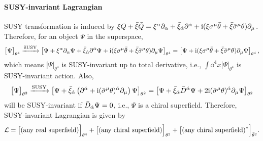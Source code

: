 \documentclass[CheatSheet]{subfiles}
\begin{document}
\paragraph{SUSY-invariant Lagrangian}
SUSY transformation is induced by $\xi Q + \bar\xi\bar Q = \xi^\alpha\partial_\alpha + \bar\xi_{\dot\alpha}\partial^{{\dot\alpha}} + \mathrm{i}(\xi\sigma^\mu\bar\theta+\bar\xi\bar\sigma^\mu\theta)\partial_\mu$.
Therefore, for an object $\Psi$ in the superspace,
\begin{equation}
 \bigl[\Psi\bigr]_{\theta^4}\xrightarrow{\text{SUSY}}
 \left[\Psi + \xi^\alpha\partial_\alpha\Psi + \bar\xi_{\dot\alpha}\partial^{{\dot\alpha}}\Psi + \mathrm{i}(\xi\sigma^\mu\bar\theta+\bar\xi\bar\sigma^\mu\theta)\partial_\mu\Psi\right]_{\theta^4}
=
 \left[\Psi +
\mathrm{i}(\xi\sigma^\mu\bar\theta+\bar\xi\bar\sigma^\mu\theta)\partial_\mu\Psi\right]_{\theta^4},
\end{equation}
which means $\bigl[\Psi\bigr]_{\theta^4}$ is SUSY-invariant up to total derivative, i.e., $\int\dd^4x \bigl[\Psi\bigr]_{\theta^4}$ is SUSY-invariant action. Also,
\begin{equation}
  \bigl[\Psi\bigr]_{\theta^2}\xrightarrow{\text{SUSY}}
 \left[\Psi + \bar\xi_{\dot\alpha}\left(\partial^{{\dot\alpha}} + \mathrm{i}(\bar\sigma^{\mu}\theta)^{\dot\alpha}\partial_\mu\right)\Psi\right]_{\theta^2}
=\left[\Psi + \bar\xi_{\dot\alpha}\bar D^{\dot\alpha}\Psi+2\mathrm{i}(\bar\sigma^{\mu}\theta)^{\dot\alpha}\partial_\mu\Psi\right]_{\theta^2}
\end{equation}
will be SUSY-invariant if $\bar D_{\dot\alpha}\Psi=0$, i.e., $\Psi$ is a chiral superfield. Therefore, SUSY-invariant Lagrangian is given by
\begin{equation}
 \mathcal L = \bigl[\text{(any real superfield)}\Bigr]_{\theta^4} + \bigl[\text{(any chiral superfield)}\Bigr]_{\theta^2} + \bigl[\text{(any chiral superfield)}^*\Bigr]_{\bar\theta^2}.
\end{equation}
\end{document}
